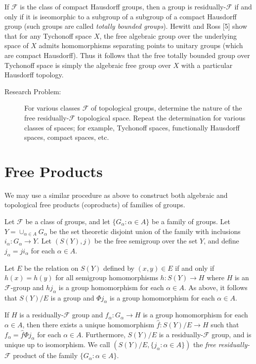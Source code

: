 \documentclass{article}
\begin{document}
If $\mathcal{F}$ is the class of compact Hausdorff groups, then a group is residually-$\mathcal{F}$ if and only if it is iseomorphic to a subgroup of a subgroup of a compact Hausdorff group (such groups are called \emph{totally bounded groups}). Hewitt and Ross [5] show that for any Tychonoff space $X$, the free algebraic group over the underlying space of $X$ admits homomorphisms separating points to unitary groups (which are compact Hausdorff). Thus it follows that the free totally bounded group over Tychonoff space is simply the algebraic free group over $X$ with a particular Hausdorff topology.

\begin{description}

\item[Research Problem:] For various classes $\mathcal{F}$ of topological groups, determine the nature of the free residually-$\mathcal{F}$ topological space. Repeat the determination for various classes of spaces; for example, Tychonoff spaces, functionally Hausdorff spaces, compact spaces, etc.

\end{description}



\section{Free Products}

We may use a similar procedure as above to construct both algebraic and topological free products (coproducts) of families of groups.

Let $\mathcal{F}$ be a class of groups, and let $\{G_{\alpha}: \alpha \in A\}$ be a family of groups. Let $Y= \cup_{\alpha \in A} G_{\alpha}$ be the set theoretic disjoint union of the family with inclusions $i_{\alpha}: G_{\alpha} \rightarrow Y$. Let $(S(Y),j)$ be the free semigroup over the set $Y$, and define $j_{\alpha} = ji_{\alpha}$ for each $\alpha \in A$.

Let $E$ be the relation on $S(Y)$ defined by $(x,y) \in E$ if and only if $h(x) = h(y)$ for all semigroup homomorphisms $h: S(Y) \rightarrow H$ where $H$ is an $\mathcal{F}$-group and $hj_{\alpha}$ is a group homomorphism for each $\alpha \in A$. As above, it follows that $S(Y)/E$ is a group and $\Phi j_{\alpha}$ is a group homomorphism for each $\alpha \in A$.

If $H$ is a residually-$\mathcal{F}$ group and $f_\alpha : G_\alpha \rightarrow H$ is a group homomorphism for each $\alpha \in A$, then there exists a unique homomorphism $\hat{f}: S(Y)/E \rightarrow H$ such that $f_{\alpha} = \hat{f} \Phi j_{\alpha}$ for each $\alpha \in A$. Furthermore, $S(Y)/E$ is a residually-$\mathcal{F}$ group, and is unique up to isomorphism. We call $(S(Y)/E, \{ j_{\alpha}: \alpha \in A \})$ the \emph{free residually-$\mathcal{F}$} product of the family $\{ G_{\alpha}: \alpha \in A \}$.
\end{document}
